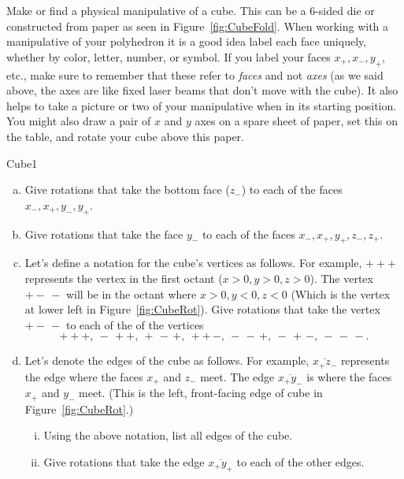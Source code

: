 \begin{rem} Make or find a physical manipulative of a cube. This can be a 6-sided die or constructed from paper as seen in Figure~\ref{fig:CubeFold}. When working with a manipulative of your polyhedron it is a good idea label each face uniquely, whether by color, letter, number, or symbol. If you label your faces $x_+, x_-, y_+,$ etc., make sure to remember that these refer to \emph{faces} and not \emph{axes} (as we said above, the axes are like fixed laser beams that don't move with the cube).  It also helps to take a picture or two of your manipulative when in its starting position. You might also draw a pair of $x$ and $y$ axes on a spare sheet of paper, set this on the table, and rotate your cube above this paper.
\end{rem}

\begin{exercise}{Cube1}
\begin{enumerate}[(a)]
\item Give rotations that take the bottom face ($z_-$) to each of the faces $x_-,x_+,y_-,y_+$.
\item Give rotations that take the face $y_- $ to each of the faces $x_-,x_+,y_+,z_-,z_+$.
\item Let's define a notation for the cube's vertices as follows.  For example, $+++$ represents the vertex in the first octant ($x>0,y>0,z>0$).  The vertex $+-\,-$ will be in the octant where $x>0,y<0,z<0$ (Which is the vertex at lower left in Figure~\ref{fig:CubeRot}).  Give rotations that take the vertex $+-\,-$ to each of the of the vertices 
\[ +++, ~-\,++,~+\,-\,+,~ ++\,-,~-\,-\,+,~-\,+\,-,~-\,-\,-. \]

\item Let's denote the edges of the cube as follows.  For example, $\overline{x_+z_-}$ represents the edge where the faces $x_+$ and $z_-$ meet.  The edge $\overline{x_+y_-}$ is where the faces $x_+$ and $y_-$ meet.  (This is the left, front-facing edge of cube in Figure~\ref{fig:CubeRot}.)  
\begin{enumerate}[(i)]
\item Using the above notation, list all edges of the cube.
\item Give rotations that take the edge $\overline{x_+y_+}$ to each of the other edges. 
\end {enumerate}
\end{enumerate}
\end{exercise} 
